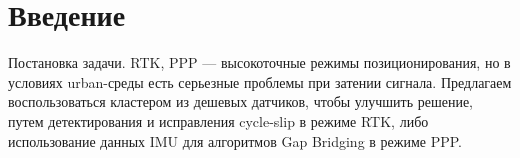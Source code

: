 \section {Введение}
Постановка задачи. RTK, PPP --- высокоточные режимы позиционирования, но в условиях urban-среды есть серьезные проблемы при затении сигнала.
Предлагаем воспользоваться кластером из дешевых датчиков, чтобы улучшить решение, путем детектирования и исправления cycle-slip в режиме RTK, либо 
использование данных IMU для алгоритмов Gap Bridging в режиме PPP.